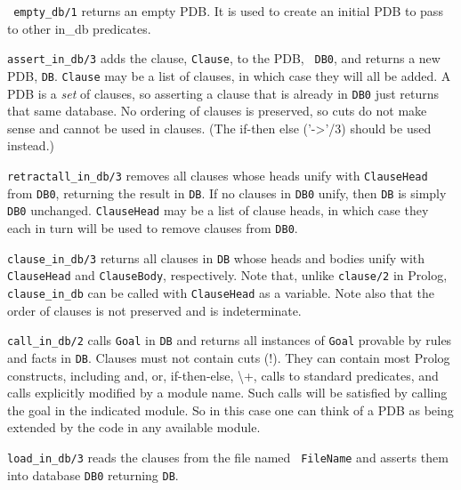 \begin{description}
 {\tt
  empty\_db/1} returns an empty PDB.  It is used to create an initial
PDB to pass to other in\_db predicates.

{\tt assert\_in\_db/3} adds the clause, {\tt Clause}, to the PDB, {\tt
  DB0}, and returns a new PDB, {\tt DB}.  {\tt Clause} may be a list
of clauses, in which case they will all be added.  A PDB is a {\em
  set} of clauses, so asserting a clause that is already in {\tt DB0}
just returns that same database.  No ordering of clauses is preserved,
so cuts do not make sense and cannot be used in clauses.  (The if-then
else ('->'/3) should be used instead.)

{\tt retractall\_in\_db/3} removes all clauses whose heads unify with
{\tt ClauseHead} from {\tt DB0}, returning the result in {\tt DB}.  If
no clauses in {\tt DB0} unify, then {\tt DB} is simply {\tt DB0}
unchanged. {\tt ClauseHead} may be a list of clause heads, in which
case they each in turn will be used to remove clauses from {\tt DB0}.

{\tt clause\_in\_db/3} returns all clauses in {\tt DB} whose heads and
bodies unify with {\tt ClauseHead} and {\tt ClauseBody}, respectively.
Note that, unlike {\tt clause/2} in Prolog, {\tt clause\_in\_db} can
be called with {\tt ClauseHead} as a variable.  Note also that the
order of clauses is not preserved and is indeterminate.

{\tt call\_in\_db/2} calls {\tt Goal} in {\tt DB} and returns all
instances of {\tt Goal} provable by rules and facts in {\tt DB}.
Clauses must not contain cuts (!).  They can contain most Prolog
constructs, including and, or, if-then-else, \textbackslash+, calls to
standard predicates, and calls explicitly modified by a module
name. Such calls will be satisfied by calling the goal in the
indicated module. So in this case one can think of a PDB as
being extended by the code in any available module.

{\tt load\_in\_db/3} reads the clauses from the file named {\tt
FileName} and asserts them into database {\tt DB0} returning {\tt DB}.


\end{description}
